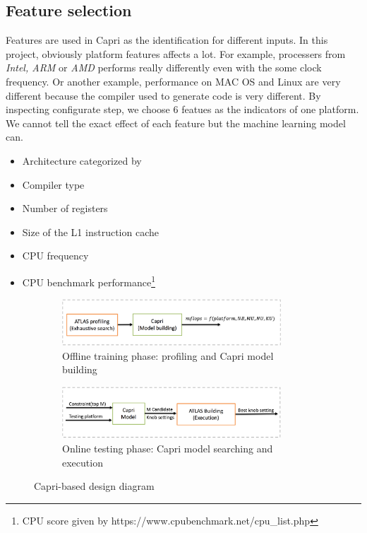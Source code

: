   \subsection{Feature selection}
  \label{sec:features}
  Features are used in Capri as the identification for different inputs. In this
  project, obviously platform features affects a lot. For example, processers
  from \emph{Intel, ARM} or \emph{AMD} performs really differently even with
  the some clock frequency. Or another example, performance on MAC OS and Linux
  are very different because the compiler used to generate code is very
  different. By inspecting \atl configurate step, we choose 6 featues as the
  indicators of one platform. We cannot tell the exact effect of each feature
  but the machine learning model can.
  \begin{itemize}
  \item Architecture categorized by \atl
  \item Compiler type
  \item Number of registers
  \item Size of the L1 instruction cache
  \item CPU frequency
  \item CPU benchmark performance\footnote{CPU score given by
  https://www.cpubenchmark.net/cpu\_list.php}
  \end{itemize}

  \begin{figure}[tbhp]
    \centering
    \begin{subfigure}[b]{1.0\linewidth}
      \centering
      \includegraphics[width=0.9\textwidth]{images/offline_training.png}
      \caption{Offline training phase: \atl profiling and Capri model building}
      \label{fig:design_train}
    \end{subfigure}
    \begin{subfigure}[b]{1.0\linewidth}
      \centering
      \includegraphics[width=0.9\textwidth]{images/testing.png}
      \caption{Online testing phase: Capri model searching and \atl execution}
      \label{fig:design_test}
    \end{subfigure}
    \caption{Capri-based \atl design diagram}
  \end{figure}

